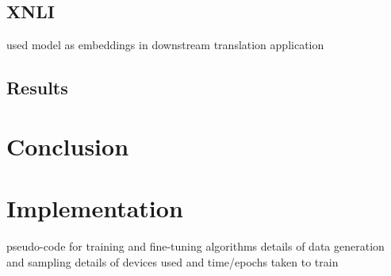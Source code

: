 \documentclass[12pt,letterpaper]{article}
\begin{document}
\begin{multicols}{2}
\subsection{XNLI}
used model as embeddings in downstream translation application

\subsection{Results}

\section{Conclusion}

\nocite{*}



\section{Implementation}
pseudo-code for training and fine-tuning algorithms
details of data generation and sampling
details of devices used and time/epochs taken to train
\end{multicols}
\end{document}
